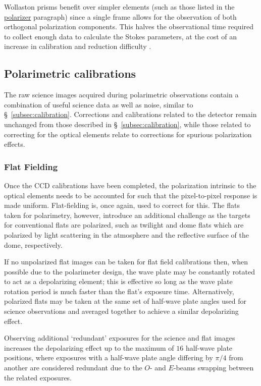 Wollaston prisms benefit over simpler elements (such as those listed in the \hyperref[par:polarizer]{polarizer} paragraph) since a single frame allows for the observation of both orthogonal polarization components. This halves the observational time required to collect enough data to calculate the Stokes parameters, at the cost of an increase in calibration and reduction difficulty \citep{wollaston}.

\subsection{Polarimetric calibrations}\label{subsec:pol_cal}

The raw science images acquired during polarimetric observations contain a combination of useful science data as well as noise, similar to \S~\ref{subsec:calibration}. Corrections and calibrations related to the detector remain unchanged from those described in \S~\ref{subsec:calibration}, while those related to correcting for the optical elements relate to corrections for spurious polarization effects.

\subsubsection{Flat Fielding}\label{subsubsec:pol_flat}

Once the \gls{CCD} calibrations have been completed, the polarization intrinsic to the optical elements needs to be accounted for such that the pixel-to-pixel response is made uniform. Flat-fielding is, once again, used to correct for this. The flats taken for polarimetry, however, introduce an additional challenge as the targets for conventional flats are polarized, such as twilight and dome flats which are polarized by light scattering in the atmosphere and the reflective surface of the dome, respectively.

If no unpolarized flat images can be taken for flat field calibrations then, when possible due to the polarimeter design, the wave plate may be constantly rotated to act as a depolarizing element; this is effective so long as the wave plate rotation period is much faster than the flat's exposure time. Alternatively, polarized flats may be taken at the same set of half-wave plate angles used for science observations and averaged together to achieve a similar depolarizing effect.

Observing additional `redundant' exposures for the science and flat images increases the depolarizing effect up to the maximum of $16$ half-wave plate positions, where exposures with a half-wave plate angle differing by $\pi / 4$ from another are considered redundant due to the $O$- and $E$-beams swapping between the related exposures.

